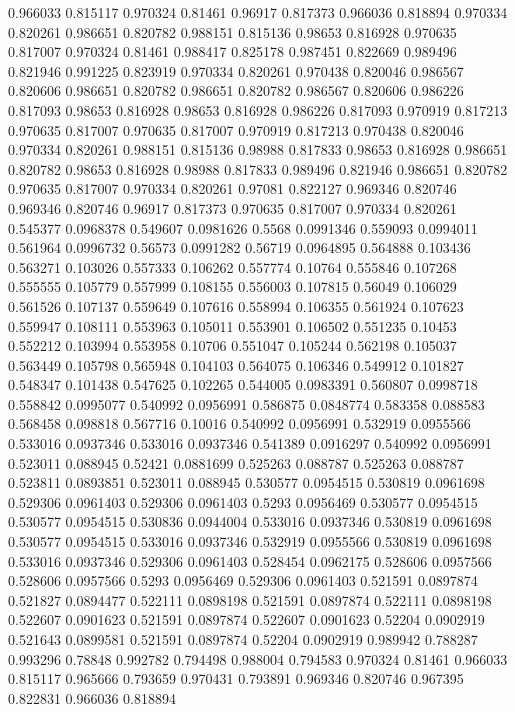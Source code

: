 0.966033 0.815117
0.970324 0.81461
0.96917 0.817373
0.966036 0.818894
0.970334 0.820261
0.986651 0.820782
0.988151 0.815136
0.98653 0.816928
0.970635 0.817007
0.970324 0.81461
0.988417 0.825178
0.987451 0.822669
0.989496 0.821946
0.991225 0.823919
0.970334 0.820261
0.970438 0.820046
0.986567 0.820606
0.986651 0.820782
0.986651 0.820782
0.986567 0.820606
0.986226 0.817093
0.98653 0.816928
0.98653 0.816928
0.986226 0.817093
0.970919 0.817213
0.970635 0.817007
0.970635 0.817007
0.970919 0.817213
0.970438 0.820046
0.970334 0.820261
0.988151 0.815136
0.98988 0.817833
0.98653 0.816928
0.986651 0.820782
0.98653 0.816928
0.98988 0.817833
0.989496 0.821946
0.986651 0.820782
0.970635 0.817007
0.970334 0.820261
0.97081 0.822127
0.969346 0.820746
0.969346 0.820746
0.96917 0.817373
0.970635 0.817007
0.970334 0.820261
0.545377 0.0968378
0.549607 0.0981626
0.5568 0.0991346
0.559093 0.0994011
0.561964 0.0996732
0.56573 0.0991282
0.56719 0.0964895
0.564888 0.103436
0.563271 0.103026
0.557333 0.106262
0.557774 0.10764
0.555846 0.107268
0.555555 0.105779
0.557999 0.108155
0.556003 0.107815
0.56049 0.106029
0.561526 0.107137
0.559649 0.107616
0.558994 0.106355
0.561924 0.107623
0.559947 0.108111
0.553963 0.105011
0.553901 0.106502
0.551235 0.10453
0.552212 0.103994
0.553958 0.10706
0.551047 0.105244
0.562198 0.105037
0.563449 0.105798
0.565948 0.104103
0.564075 0.106346
0.549912 0.101827
0.548347 0.101438
0.547625 0.102265
0.544005 0.0983391
0.560807 0.0998718
0.558842 0.0995077
0.540992 0.0956991
0.586875 0.0848774
0.583358 0.088583
0.568458 0.098818
0.567716 0.10016
0.540992 0.0956991
0.532919 0.0955566
0.533016 0.0937346
0.533016 0.0937346
0.541389 0.0916297
0.540992 0.0956991
0.523011 0.088945
0.52421 0.0881699
0.525263 0.088787
0.525263 0.088787
0.523811 0.0893851
0.523011 0.088945
0.530577 0.0954515
0.530819 0.0961698
0.529306 0.0961403
0.529306 0.0961403
0.5293 0.0956469
0.530577 0.0954515
0.530577 0.0954515
0.530836 0.0944004
0.533016 0.0937346
0.530819 0.0961698
0.530577 0.0954515
0.533016 0.0937346
0.532919 0.0955566
0.530819 0.0961698
0.533016 0.0937346
0.529306 0.0961403
0.528454 0.0962175
0.528606 0.0957566
0.528606 0.0957566
0.5293 0.0956469
0.529306 0.0961403
0.521591 0.0897874
0.521827 0.0894477
0.522111 0.0898198
0.521591 0.0897874
0.522111 0.0898198
0.522607 0.0901623
0.521591 0.0897874
0.522607 0.0901623
0.52204 0.0902919
0.521643 0.0899581
0.521591 0.0897874
0.52204 0.0902919
0.989942 0.788287
0.993296 0.78848
0.992782 0.794498
0.988004 0.794583
0.970324 0.81461
0.966033 0.815117
0.965666 0.793659
0.970431 0.793891
0.969346 0.820746
0.967395 0.822831
0.966036 0.818894
